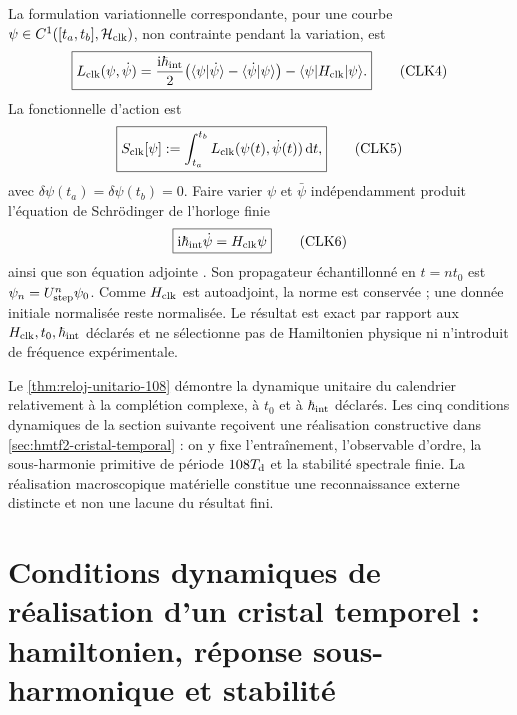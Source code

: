 La formulation variationnelle correspondante, pour une courbe
\(\psi\in C^1([t_a,t_b],\mathcal H_{\rm clk})\), non contrainte pendant la
variation, est
\[
 \boxed{
 L_{\rm clk}(\psi,\dot\psi)
 =\frac{\mathrm i\hbar_{\rm int}}2
 \bigl(
 \langle\psi|\dot\psi\rangle
 -\langle\dot\psi|\psi\rangle
 \bigr)
 -\langle\psi|H_{\rm clk}|\psi\rangle.}
 \tag{CLK4}\label{eq:lagrangiano-reloj-108}
\]
La fonctionnelle d’action est
\[
 \boxed{
 S_{\rm clk}[\psi]
 :=\int_{t_a}^{t_b}
 L_{\rm clk}(\psi(t),\dot\psi(t))\,\mathrm dt,}
 \tag{CLK5}\label{eq:accion-reloj-108}
\]
avec \(\delta\psi(t_a)=\delta\psi(t_b)=0\).
Faire varier \(\psi\) et \(\bar\psi\) indépendamment produit l’équation de
Schrödinger de l’horloge finie
\[
 \boxed{\mathrm i\hbar_{\rm int}\dot\psi=H_{\rm clk}\psi}
 \tag{CLK6}\label{eq:schrodinger-reloj-108}
\]
ainsi que son équation adjointe \cite{SchrodingerNobel}. Son propagateur échantillonné
en \(t=nt_0\) est \(\psi_n=U_{\rm step}^{n}\psi_0\). Comme \(H_{\rm clk}\) est
autoadjoint, la norme est conservée ; une donnée initiale normalisée reste
normalisée. Le résultat est exact par rapport aux
\(H_{\rm clk},t_0,\hbar_{\rm int}\) déclarés et ne sélectionne pas de Hamiltonien
physique ni n’introduit de fréquence expérimentale.

Le \cref{thm:reloj-unitario-108} démontre la dynamique unitaire du calendrier
relativement à la complétion complexe, à \(t_0\) et à \(\hbar_{\rm int}\)
déclarés. Les cinq conditions dynamiques de la section suivante reçoivent
une réalisation constructive dans \cref{sec:hmtf2-cristal-temporal} : on y
fixe l'entraînement, l'observable d'ordre, la sous-harmonie primitive de période
\(108T_{\rm d}\) et la stabilité spectrale finie. La réalisation
macroscopique matérielle constitue une reconnaissance externe distincte et non une
lacune du résultat fini.

\section{Conditions dynamiques de réalisation d'un cristal temporel : hamiltonien, réponse sous-harmonique et stabilité}
\label{sec:programa-cristal-tiempo}

